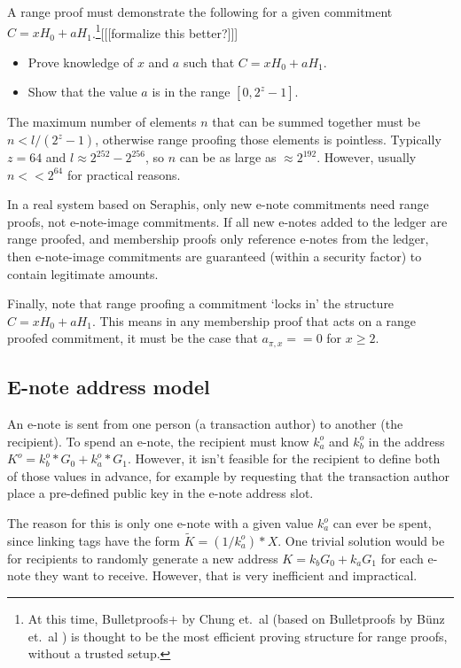 A range proof must demonstrate the following for a given commitment $C = x H_0 + a H_1$.\footnote{At this time, Bulletproofs+ by Chung et.\ al \cite{bulletproofs_plus} (based on Bulletproofs by B\"{u}nz et.\ al \cite{Bulletproofs_paper}) is thought to be the most efficient proving structure for range proofs, without a trusted setup.}[[[formalize this better?]]]

\begin{itemize}
    \item Prove knowledge of $x$ and $a$ such that $C = x H_0 + a H_1$.

    \item Show that the value $a$ is in the range $[0, 2^{z} - 1]$.
\end{itemize}

The maximum number of elements $n$ that can be summed together must be $n < l / (2^z - 1)$, otherwise range proofing those elements is pointless. Typically $z = 64$ and $l \approx 2^{252} - 2^{256}$, so $n$ can be as large as $\approx 2^{192}$. However, usually $n << 2^{64}$ for practical reasons.

In a real system based on Seraphis, only new e-note commitments need range proofs, not e-note-image commitments. If all new e-notes added to the ledger are range proofed, and membership proofs only reference e-notes from the ledger, then e-note-image commitments are guaranteed (within a security factor) to contain legitimate amounts.

Finally, note that range proofing a commitment `locks in' the structure $C = x H_0 + a H_1$. This means in any membership proof that acts on a range proofed commitment, it must be the case that $a_{\pi,x} == 0$ for $x \geq 2$.


\subsection{E-note address model}
\label{subsec:seraphis-address-model}

An e-note is sent from one person (a transaction author) to another (the recipient). To spend an e-note, the recipient must know $k^o_a$ and $k^o_b$ in the address $K^o = k^o_b*G_0 + k^o_a*G_1$. However, it isn't feasible for the recipient to define both of those values in advance, for example by requesting that the transaction author place a pre-defined public key in the e-note address slot.

The reason for this is only one e-note with a given value $k^o_a$ can ever be spent, since linking tags have the form $\tilde{K} = (1/k^o_a)*X$. One trivial solution would be for recipients to randomly generate a new address $K = k_b G_0 + k_a G_1$ for each e-note they want to receive. However, that is very inefficient and impractical.

